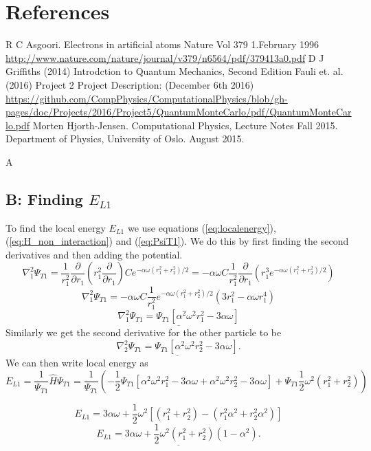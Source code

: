 \documentclass[norsk,a4paper,12pt]{article}
\begin{document}
\section{References}
\begingroup
\renewcommand{\section}[2]{}
\begin{thebibliography}{}
  R C Asgoori. 
  Electrons in artificial atoms
  Nature Vol 379 1.February 1996
  \url{http://www.nature.com/nature/journal/v379/n6564/pdf/379413a0.pdf}
  D J Griffiths (2014)
  Introdction to Quantum Mechanics, Second Edition
  Fauli et. al. (2016)
  Project 2
  Project Description: 					(December 6th 2016)\newline
  \url{https://github.com/CompPhysics/ComputationalPhysics/blob/gh-  pages/doc/Projects/2016/Project5/QuantumMonteCarlo/pdf/QuantumMonteCarlo.pdf}
  Morten Hjorth-Jensen.
  Computational Physics, Lecture Notes Fall 2015.
  Department of Physics, University of Oslo.
  August 2015.
\end{thebibliography}

\newpage
\section{Appendices}
\subsection{A}

\subsection{B: Finding $E_{L1}$}
To find the local energy $E_{L1}$ we use equations (\ref{eq:localenergy}), (\ref{eq:H_non_interaction}) and (\ref{eq:PsiT1}). We do this by first finding the second derivatives and then adding the potential.
$$\nabla_1^2 \Psi_{T1} = \frac{1}{r_1^2}\frac{\partial}{\partial r_1}(r_1^2 \frac{\partial}{\partial r_1})Ce^{-\alpha \omega (r_1^2+r_2^2)/2} = -\alpha \omega C\frac{1}{r_1^2}\frac{\partial}{\partial r_1}(r_1^3e^{-\alpha\omega(r_1^2+r_2^2)/2})$$
$$\nabla_1^2 \Psi_{T1} = -\alpha \omega C\frac{1}{r_1^2}e^{-\alpha \omega (r_1^2+r_2^2)/2}(3r_1^2 - \alpha \omega r_1^4)$$
$$\underline{\nabla_1^2 \Psi_{T1} = \Psi_{T1}[\alpha ^2\omega ^2r_1^2 - 3\alpha \omega]}$$
Similarly we get the second derivative for the other particle to be
$$\underline{\nabla_2^2 \Psi_{T1} = \Psi_{T1}[\alpha ^2\omega ^2r_2^2 - 3\alpha \omega]}.$$
We can then write local energy as
$$E_{L1} = \frac{1}{\Psi_{T1}}\hat{H}\Psi_{T1} = \frac{1}{\Psi_{T1}}\left(-\frac{1}{2}\Psi_{T1}[\alpha ^2\omega ^2r_1^2 - 3\alpha \omega + \alpha ^2\omega ^2r_2^2 - 3\alpha \omega] + \Psi_{T1}\frac{1}{2} \omega^2(r_1^2+r_2^2)\right)$$

$$E_{L1} = 3\alpha \omega +\frac{1}{2}\omega^2\left[(r_1^2+r_2^2) - (r_1^2\alpha^2 + r_2^2\alpha^2)\right]$$
$$\underline{E_{L1} = 3\alpha \omega + \frac{1}{2}\omega^2(r_1^2+r_2^2)(1-\alpha^2).}$$
\end{document}
